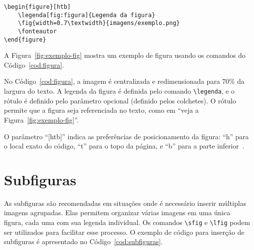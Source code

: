 \documentclass[
    12pt
    ,oneside
    ,a4paper
    ,chapter=TITLE
    ,section=TITLE
    ,sumario=abnt-6027-2012]{abntex2}
\begin{document}
\begin{codigo}[htb]
\begin{lstlisting}
\begin{figure}[htb]
    \legenda[fig:figura]{Legenda da figura}
    \fig{width=0.7\textwidth}{imagens/exemplo.png}
    \fonteautor
\end{figure}
\end{lstlisting}
\fonteautor
\end{codigo}

A Figura~\ref{fig:exemplo-fig} mostra um exemplo de figura usando os comandos do  Código~\ref{cod:figura}. 

\begin{figure}[htb]
\end{figure}


No Código~\ref{cod:figura}, a imagem é centralizada e redimensionada para 70\% da largura do texto. A legenda da figura é definida pelo comando \texttt{\textbackslash legenda}, e o rótulo é definido pelo parâmetro opcional (definido pelos colchetes). O rótulo permite que a figura seja referenciada no texto, como em ``veja a Figura~\ref{fig:exemplo-fig}''. 

O parâmetro ``[htb]'' indica as preferências de posicionamento da figura: ``h'' para o local exato do código, ``t'' para o topo da página, e ``b'' para a parte inferior~\cite{goossens1997latex}. 

\section{Subfiguras}
\label{sec:subfiguras}

As subfiguras são recomendadas em situações onde é necessário inserir múltiplas imagens agrupadas. Elas permitem organizar várias imagens em uma única figura, cada uma com sua legenda individual. Os comandos \texttt{\textbackslash sfig} e \texttt{\textbackslash lfig} podem ser utilizados para facilitar esse processo. O exemplo de código para inserção de subfiguras é apresentado no Código~\ref{cod:subfiguras}.
\end{document}
